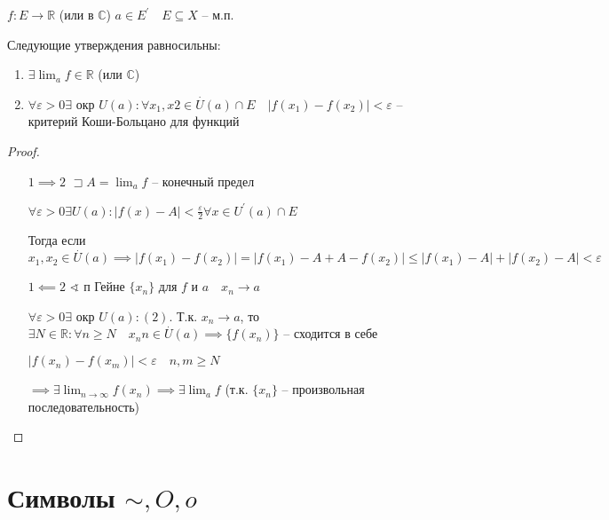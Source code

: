 \documentclass{book}
\newcommand\R{\ensuremath{\mathbb{R}}}
\renewcommand\C{\ensuremath{\mathbb{C}}}
\newcommand{\p}[1]{#1^{\prime}}
\theoremstyle{definition}
\begin{document}
\begin{theorem}
    $f:E\to \R$ (или в $\C$) $a\in \p E\quad E\subseteq X$ -- м.п.

    Следующие утверждения равносильны:
    \begin{enumerate}
        \item $\exists \lim_af\in \R$ (или $\C$)
        \item $\forall \varepsilon>0\exists $ окр $U(a):\forall x_1,x 2\in \overset{\cdot }U(a)\cap E\quad \left| f(x_1) - f(x_2) \right| <\varepsilon$ -- критерий Коши-Больцано для функций
    \end{enumerate}
\end{theorem}
\begin{proof}
    \begin{itemize}
        \item []
        \item [$1\implies 2$] $\sqsupset A = \lim_af$ -- конечный предел

            $\forall \varepsilon>0\exists U(a):\left| f(x)-A \right| <\frac{\varepsilon}{2} \forall x\in \p U(a)\cap E$ 

            Тогда если $x_1, x_2\in \overset{\cdot }U(a) \implies \left| f(x_1) - f(x_2) \right| = \left| f(x_1)-A+A-f(x_2) \right| \leqslant \left| f(x_1)-A \right|  + \left| f(x_2)-A \right| <\varepsilon$
        \item [$1\impliedby 2$] $\sphericalangle $ п Гейне $\{x_{n} \}$ для $f$ и  $a\quad x_{n} \to a$

            $\forall \varepsilon>0\exists$ окр $U(a):(2)$. Т.к. $x_{n} \to a$, то $\exists N\in \R: \forall n\geqslant N\quad x_{n} n\in \overset{\cdot }U(a) \implies \{f(x_{n} )\}$ -- сходится в себе

            $\left| f(x_{n} ) - f(x_{m} ) \right| <\varepsilon\quad n, m\geqslant N$

            $\implies \exists \lim_{n \to \infty} f(x_{n} ) \implies \exists \lim_a f$ (т.к. $\{x_{n} \}$ -- произвольная последовательность)
    \end{itemize}
\end{proof}

\section{Символы $\sim , O, o$}
\end{document}

